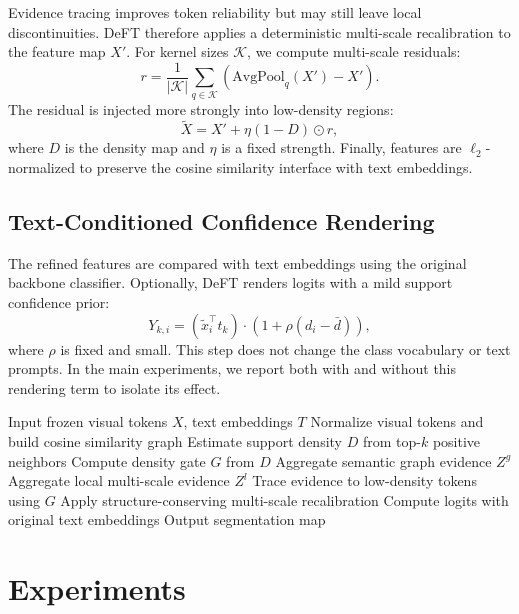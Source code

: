 \documentclass[letterpaper]{article}
\begin{document}
Evidence tracing improves token reliability but may still leave local
discontinuities. DeFT therefore applies a deterministic multi-scale
recalibration to the feature map $X'$. For kernel sizes $\mathcal{K}$, we compute
multi-scale residuals:
\begin{equation}
    r = \frac{1}{|\mathcal{K}|} \sum_{q \in \mathcal{K}}
    \left(\mathrm{AvgPool}_q(X') - X'\right).
\end{equation}
The residual is injected more strongly into low-density regions:
\begin{equation}
    \tilde{X} = X' + \eta (1-D) \odot r,
\end{equation}
where $D$ is the density map and $\eta$ is a fixed strength. Finally, features
are $\ell_2$-normalized to preserve the cosine similarity interface with text
embeddings.

\subsection{Text-Conditioned Confidence Rendering}

The refined features are compared with text embeddings using the original
backbone classifier. Optionally, DeFT renders logits with a mild support
confidence prior:
\begin{equation}
    Y_{k,i} = (\tilde{x}_i^\top t_k) \cdot
    \left(1 + \rho(d_i - \bar{d})\right),
\end{equation}
where $\rho$ is fixed and small. This step does not change the class vocabulary
or text prompts. In the main experiments, we report both with and without this
rendering term to isolate its effect.

\begin{algorithm}[t]
\caption{DeFT Inference}
\begin{algorithmic}[1]
\STATE Input frozen visual tokens $X$, text embeddings $T$
\STATE Normalize visual tokens and build cosine similarity graph
\STATE Estimate support density $D$ from top-$k$ positive neighbors
\STATE Compute density gate $G$ from $D$
\STATE Aggregate semantic graph evidence $Z^g$
\STATE Aggregate local multi-scale evidence $Z^l$
\STATE Trace evidence to low-density tokens using $G$
\STATE Apply structure-conserving multi-scale recalibration
\STATE Compute logits with original text embeddings
\STATE Output segmentation map
\end{algorithmic}
\end{algorithm}

\section{Experiments}
\end{document}

